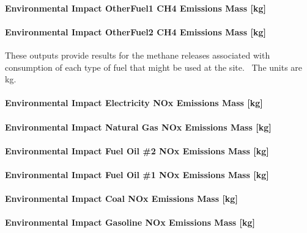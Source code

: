 \paragraph{Environmental Impact OtherFuel1 CH4 Emissions Mass {[}kg{]}}\label{environmental-impact-otherfuel1-ch4-emissions-mass-kg}

\paragraph{Environmental Impact OtherFuel2 CH4 Emissions Mass {[}kg{]}}\label{environmental-impact-otherfuel2-ch4-emissions-mass-kg}

These outputs provide results for the methane releases associated with consumption of each type of fuel that might be used at the site.~ The units are kg.

\paragraph{Environmental Impact Electricity NOx Emissions Mass {[}kg{]}}\label{environmental-impact-electricity-nox-emissions-mass-kg}

\paragraph{Environmental Impact Natural Gas NOx Emissions Mass {[}kg{]}}\label{environmental-impact-natural-gas-nox-emissions-mass-kg}

\paragraph{Environmental Impact Fuel Oil \#2 NOx Emissions Mass {[}kg{]}}\label{environmental-impact-fuel-oil-2-nox-emissions-mass-kg}

\paragraph{Environmental Impact Fuel Oil \#1 NOx Emissions Mass {[}kg{]}}\label{environmental-impact-fuel-oil-1-nox-emissions-mass-kg}

\paragraph{Environmental Impact Coal NOx Emissions Mass {[}kg{]}}\label{environmental-impact-coal-nox-emissions-mass-kg}

\paragraph{Environmental Impact Gasoline NOx Emissions Mass {[}kg{]}}\label{environmental-impact-gasoline-nox-emissions-mass-kg}

